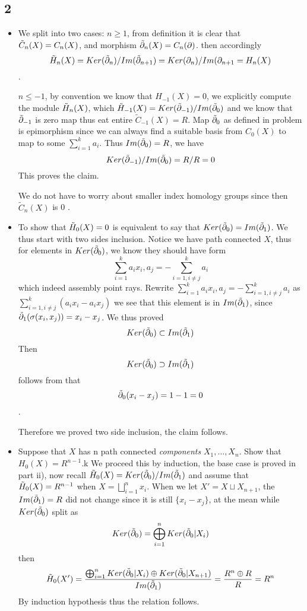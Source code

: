\documentclass[11pt]{article}
\theoremstyle{remark}
\begin{document}
\subsection*{2}
    \begin{itemize}
        \item We split into two cases: $n\geq1$, from definition it is clear that $\Tilde{C}_n(X)=C_n(X)$, and morphism $\Tilde{\partial}_n(X)=C_n(\partial)$. then accordingly $$\Tilde{H}_n(X)=Ker(\Tilde{\partial}_n)/Im(\Tilde{\partial}_{n+1})=Ker(\partial_n)/Im(\partial_{n+1}={H}_n(X) $$.
        
        $n\leq-1$, by convention we know that $H_{-1}(X)=0$, we explicitly compute the module $\Tilde{H}_n(X)$, which $\Tilde{H}_{-1}(X)=Ker(\Tilde{\partial}_{-1})/Im(\Tilde{\partial}_{0})$ and we know that $\Tilde{\partial}_{-1}$ is zero map thus eat entire $\tilde{C}_{-1}(X)=R$. Map $\Tilde{\partial}_{0}$ as defined in problem is epimorphism since we can always find a suitable basis from $C_0(X)$ to map to some $\sum_{i=1}^{k}a_i$. Thus $Im(\Tilde{\partial}_{0})=R$, we have $$ Ker(\Tilde{\partial}_{-1})/Im(\Tilde{\partial}_{0})=R/R=0$$ This proves the claim.
        
        We do not have to worry about smaller index homology groups since then $\tilde{C}_n(X)$ is 0 . 
        
        \item To show that $\Tilde{H}_0(X)=0$ is equivalent to say that $Ker(\Tilde{\partial}_{0})=Im(\Tilde{\partial}_{1})$. We thus start with two sides inclusion. Notice we have path connected $X$, thus for elements in $Ker(\Tilde{\partial}_{0})$, we know they should have form $$\sum_{i=1}^{k}a_ix_i, a_j=-\sum_{i=1,i \not= j}^{k}a_i$$ which indeed assembly point rays. Rewrite  $\sum_{i=1}^{k}a_ix_i, a_j=-\sum_{i=1,i\not= j}^{k}a_i$ as  $\sum_{i=1,i\not= j}^{k}(a_ix_i-a_ix_j) $ we see that this element is in $Im(\Tilde{\partial}_{1})$, since $\Tilde{\partial}_{1}(\sigma(x_i,x_j))=x_i-x_j$. We thus proved  $$Ker(\Tilde{\partial}_{0})\subset Im(\Tilde{\partial}_{1})$$
        Then $$Ker(\Tilde{\partial}_{0}) \supset Im(\Tilde{\partial}_{1})$$ follows from that $$\Tilde{\partial}_{0}(x_i-x_j)=1-1=0$$.
        
        Therefore we proved two side inclusion, the claim follows.
        \item
        Suppose that $X$ has n path connected \textit{components} $X_1,\dots, X_n$. Show that $H_0(X)=R^{n-1}$.k
        We proceed this by induction, the base case is proved in part ii), now recall $\Tilde{H}_0(X)=Ker(\Tilde{\partial}_0)/Im(\Tilde{\partial}_{1})$ and assume that $\Tilde{H}_0(X)=R^{n-1}$ when $X=\bigsqcup_{i=1}^{n}{x_i}$. When we let $X'=X \sqcup {X_{n+1}} $, the $Im(\Tilde{\partial}_{1})=R$ did not change since it is still $\{x_i-x_j\}$, at the mean while  $Ker(\Tilde{\partial}_0)$ split as $$Ker(\Tilde{\partial}_0)=\bigoplus_{i=1}^{n}{Ker(\Tilde{\partial}_0|X_i)}$$ then $$\Tilde{H}_0(X')=\frac{\bigoplus_{i=1}^{n}Ker(\Tilde{\partial}_0|X_i) \oplus Ker(\Tilde{\partial}_0|X_{n+1})}{Im(\Tilde{\partial}_{1})}=\frac{R^{n}\oplus R}{R}=R^n$$
        By induction hypothesis thus the relation follows.
        
    \end{itemize}
    
\end{document}
